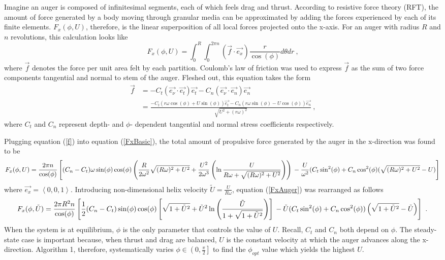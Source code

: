 \documentclass[letterpaper, 11 pt]{article}
\begin{document}
Imagine an auger is composed of infinitesimal segments, each of which feels drag and thrust. According to resistive force theory (RFT), the amount of force generated by a body moving through granular media can be approximated by adding the forces experienced by each of its finite elements. $F_x(\phi,U)$, therefore, is the linear superposition of all local forces projected onto the x-axis. For an auger with radius $R$ and $n$ revolutions, this calculation looks like
\begin{equation}\label{FxBasic}
F_x(\phi,U) = \int_{0}^{R}\int_{0}^{2\pi n} (\vec{f}\cdot\vec{e_x})\frac{r}{\cos(\phi)} d\theta dr\ \text{,}
\end{equation}
where $\vec{f}$ denotes the force per unit area felt by each partition. Coulomb's law of friction was used to express $\vec{f}$ as the sum of two force components tangential and normal to stem of the auger. Fleshed out, this equation takes the form
\begin{equation}\label{f}
\begin{split} 
\vec{f} &= -C_t(\vec{e_\nu}\cdot\vec{e_t})\vec{e_t}-C_n(\vec{e_\nu}\cdot\vec
{e_n})\vec{e_n} \\
&=\frac{-C_t(r\omega\cos(\phi)+U\sin(\phi))\vec{e_t}-C_n(r\omega\sin(\phi)-U\cos(\phi))\vec{e_n}}{\sqrt{U^2+(r\omega)^2}}\ \text{,}
\end{split} 
\end{equation}
where $C_t$ and $C_n$ represent depth- and $\phi$- dependent tangential and normal stress coefficients respectively. 

Plugging equation (\ref{f}) into equation (\ref{FxBasic}), the total amount of propulsive force generated by the auger in the x-direction was found to be  
\begin{dmath}\label{FxAuger}
F_x(\phi,U) = \frac{2\pi n}{\cos(\phi)}\left[(C_n-C_t)\omega\sin(\phi)\cos(\phi)\left( \frac{R}{2\omega^2}\sqrt{(R\omega)^2+U^2}+\frac{U^2}{2\omega^3}\left( \ln\frac{U}{R\omega+\sqrt{(R\omega)^2+U^2}}\right) \right) \\
- \frac{U}{\omega^2}(C_t\sin^2(\phi)+C_n\cos^2(\phi)(\sqrt{(R\omega)^2+U^2}-U) \right] 
\end{dmath}
where $\vec{e_x} = \left\langle 0,0,1 \right\rangle $. Introducing non-dimensional helix velocity $\tilde{U} = \frac{U}{R\omega}$, equation (\ref{FxAuger}) was rearranged as follows
\begin{dmath}\label{NDFxAuger}
F_x(\phi, \tilde{U}) = \frac{2\pi R^2n}{\cos(\phi)}\left[\frac{1}{2}(C_n-C_t)\sin(\phi)\cos(\phi)\left[\sqrt{1+\tilde{U}^2}+\tilde{U}^2\ln\left(\frac{\tilde{U}}{1+\sqrt{1+\tilde{U}^2}} \right)  \right] \\
- \tilde{U}(C_t\sin^2(\phi)+C_n\cos^2(\phi))\left(\sqrt{1+\tilde{U}^2}-\tilde{U}\right) \right]\ \text{.} 
\end{dmath}
When the system is at equilibrium, $\phi$ is the only parameter that controls the value of $U$. Recall, $C_t$ and $C_n$ both depend on $\phi$. The steady-state case is important because, when thrust and drag are balanced, $U$ is the constant velocity at which the auger advances along the x-direction. Algorithm 1, therefore, systematically varies $\phi\in\left(0,\frac{\pi}{2} \right] $ to find the $\phi_{opt}$ value which yields the highest $U$.  
\end{document}
